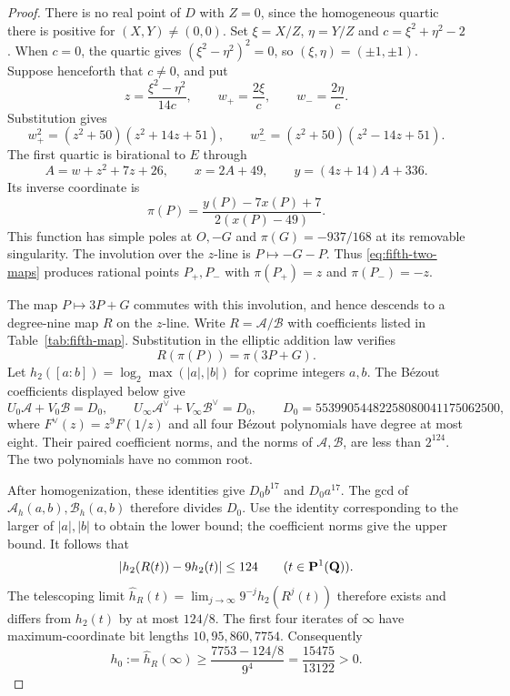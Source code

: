 \begin{proof}
There is no real point of $D$ with $Z=0$, since the homogeneous
quartic there is positive for $(X,Y)\ne(0,0)$.
Set $\xi=X/Z$, $\eta=Y/Z$ and $c=\xi^2+\eta^2-2$.
When $c=0$, the quartic gives $(\xi^2-\eta^2)^2=0$, so
$(\xi,\eta)=(\pm1,\pm1)$.
Suppose henceforth that $c\ne0$, and put
\[
 z=\frac{\xi^2-\eta^2}{14c},\qquad
 w_+=\frac{2\xi}{c},\qquad w_-=\frac{2\eta}{c}.
\]
Substitution gives
\begin{equation}
 w_+^2=(z^2+50)(z^2+14z+51),\qquad
 w_-^2=(z^2+50)(z^2-14z+51).
 \label{eq:fifth-two-maps}
\end{equation}
The first quartic is birational to $E$ through
\[
 A=w+z^2+7z+26,\qquad
 x=2A+49,\qquad y=(4z+14)A+336.
\]
Its inverse coordinate is
\begin{equation}
 \pi(P)=\frac{y(P)-7x(P)+7}{2(x(P)-49)}.
 \label{eq:fifth-pi}
\end{equation}
This function has simple poles at $O,-G$ and
$\pi(G)=-937/168$ at its removable singularity.
The involution over the $z$-line is $P\mapsto-G-P$.
Thus \eqref{eq:fifth-two-maps} produces rational points $P_+,P_-$
with $\pi(P_+)=z$ and $\pi(P_-)=-z$.

The map $P\mapsto3P+G$ commutes with this involution, and hence
descends to a degree-nine map $R$ on the $z$-line.  Write
$R=\mathcal A/\mathcal B$ with coefficients listed in
Table~\ref{tab:fifth-map}.  Substitution in the elliptic addition
law verifies
\begin{equation}
 R(\pi(P))=\pi(3P+G).
 \label{eq:fifth-triplication}
\end{equation}
Let $h_2([a:b])=\log_2\max(|a|,|b|)$ for coprime integers
$a,b$.  The B\'ezout coefficients displayed below give
\[
 U_0\mathcal A+V_0\mathcal B=D_0,
 \qquad U_\infty\mathcal A^\vee+V_\infty\mathcal B^\vee=D_0,
 \qquad D_0=55399054482258080041175062500,
\]
where $F^\vee(z)=z^9F(1/z)$ and all four B\'ezout polynomials
have degree at most eight.  Their paired coefficient norms, and
the norms of $\mathcal A,\mathcal B$, are less than $2^{124}$.
The two polynomials have no common root.

After homogenization, these identities give $D_0b^{17}$ and
$D_0a^{17}$.  The gcd of
$\mathcal A_h(a,b),\mathcal B_h(a,b)$ therefore divides $D_0$.
Use the identity corresponding to the larger of $|a|,|b|$ to
obtain the lower bound; the coefficient norms give the upper bound.
It follows that
\begin{equation}
 |h_2(R(t))-9h_2(t)|\leq124\qquad(t\in\mathbf P^1(\mathbf Q)).
 \label{eq:fifth-height-error}
\end{equation}
The telescoping limit
$\widehat h_R(t)=\lim_{j\to\infty}9^{-j}h_2(R^j(t))$
therefore exists and differs from $h_2(t)$ by at most $124/8$.
The first four iterates of $\infty$ have maximum-coordinate
bit lengths $10,95,860,7754$.  Consequently
\begin{equation}
 h_0:=\widehat h_R(\infty)
 \geq\frac{7753-124/8}{9^4}
 =\frac{15475}{13122}>0.
 \label{eq:fifth-positive-height}
\end{equation}


\end{proof}
